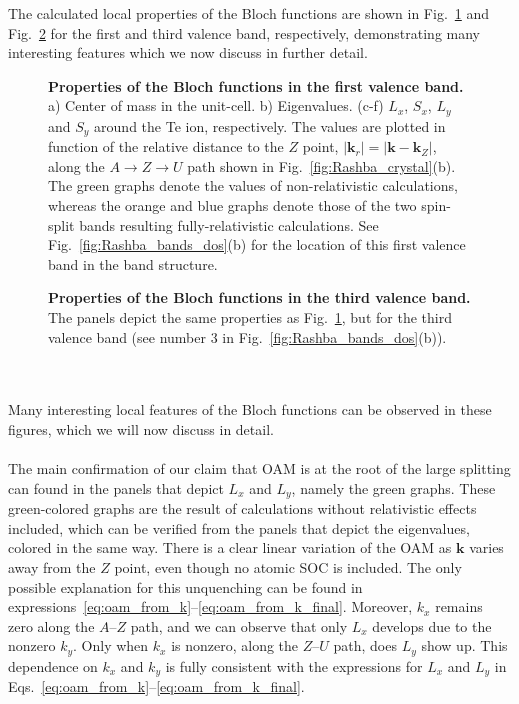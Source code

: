 The calculated local properties of the Bloch functions are shown in Fig.~\ref{fig:Rashba_oamvseigvalv1} and Fig.~\ref{fig:Rashba_oamvseigvalv2} for the first and third valence band, respectively, demonstrating many interesting features which we now discuss in further detail.
\begin{figure}
	\centering
{}
\caption{\label{fig:Rashba_oamvseigvalv1}{\bf Properties of the Bloch functions in the first valence band.} a) Center of mass in the unit-cell. b) Eigenvalues. (c-f) $L_x$, $S_x$, $L_y$ and $S_y$ around the Te ion, respectively. The values are plotted in function of the relative distance to the $Z$ point, $|\bm{k}_r| = |\bm{k} - \bm{k}_Z|$, along the $A \rightarrow Z \rightarrow U$ path shown in Fig.~\ref{fig:Rashba_crystal}(b). The green graphs denote the values of non-relativistic calculations, whereas the orange and blue graphs denote those of the two spin-split bands resulting fully-relativistic calculations. See Fig.~\ref{fig:Rashba_bands_dos}(b) for the location of this first valence band in the band structure.}
\end{figure}
\begin{figure}[h!]
	\centering
{}
\caption{\label{fig:Rashba_oamvseigvalv2}{\bf Properties of the Bloch functions in the third valence band.} The panels depict the same properties as Fig.~\ref{fig:Rashba_oamvseigvalv1}, but for the third valence band (see number 3 in Fig.~\ref{fig:Rashba_bands_dos}(b)).}
\end{figure}
\\\\
Many interesting local features of the Bloch functions can be observed in these figures, which we will now discuss in detail.
\\\\
The main confirmation of our claim that OAM is at the root of the large splitting can found in the panels that depict $L_x$ and $L_y$, namely the green graphs. These green-colored graphs are the result of calculations without relativistic effects included, which can be verified from the panels that depict the eigenvalues, colored in the same way.
There is a clear linear variation of the OAM as $\bm k$ varies away from the $Z$ point, even though no atomic SOC is included.
The only possible explanation for this unquenching can be found in expressions~\eqref{eq:oam_from_k}--\eqref{eq:oam_from_k_final}.
Moreover, $k_x$ remains zero along the $A$--$Z$ path, and we can observe that only $L_x$ develops due to the nonzero $k_y$. Only when $k_x$ is nonzero, along the $Z$--$U$ path, does $L_y$ show up. This dependence on $k_x$ and $k_y$ is fully consistent with the expressions for $L_x$ and $L_y$ in Eqs.~\eqref{eq:oam_from_k}--\eqref{eq:oam_from_k_final}.
